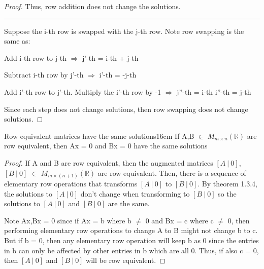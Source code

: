 \begin{proof}
        Thus, row addition does not change the solutions.

        \rule[0.1cm]{16.7cm}{0.01cm}

        Suppose the i-th row is swapped with the j-th row.
        Note row swapping is the same as:

        \hspace{0.5cm}
        Add i-th row to j-th
        \hspace{0.5cm}
        $\Rightarrow$
        \hspace{0.5cm}
        j'-th = i-th + j-th

        \hspace{0.5cm}
        Subtract i-th row by j'-th
        \hspace{0.5cm}
        $\Rightarrow$
        \hspace{0.5cm}
        i'-th = -j-th

        \hspace{0.5cm}
        Add i'-th row to j'-th.
        Multiply the i'-th row by -1
        \hspace{0.5cm}
        $\Rightarrow$
        \hspace{0.5cm}
        j''-th = i-th
        \hspace{0.5cm}
        i''-th = j-th

        Since each step does not change solutions,
        then row swapping does not change solutions.
    \end{proof}

    \vspace{0.5cm}



    \begin{wtheorem}{Row equivalent matrices have the same solutions}{16cm}
        If A,B $\in$ $M_{m \times n}(\mathbb{R})$
        are row equivalent, then Ax = 0 and Bx = 0
        have the same solutions
    \end{wtheorem}

    \begin{proof}
        If A and B are row equivalent, then the augmented matrices
        $[A \ | \ 0]$,$[B \ | \ 0]$ $\in$ $M_{m \times (n+1)}(\mathbb{R})$
        are row equivalent.
        Then, there is a sequence of elementary
        row operations that transforms $[A \ | \ 0]$ to $[B \ | \ 0]$.
        By {\color{red} theorem 1.3.4}, the solutions to $[A \ | \ 0]$
        don't change when transforming to $[B \ | \ 0]$
        so the solutions to $[A \ | \ 0]$ and $[B \ | \ 0]$ are the same.

        Note Ax,Bx = 0 since if Ax = b where b $\not =$ 0
        and Bx = c where c $\not =$ 0,
        then performing elementary row operations to change A to B might
        not change b to c. But if b = 0, then any elementary row operation will
        keep b as 0 since the entries in b can only be affected by other entries
        in b which are all 0. Thus, if also c = 0, then $[A \ | \ 0]$
        and $[B \ | \ 0]$ will be row equivalent.
    \end{proof}

